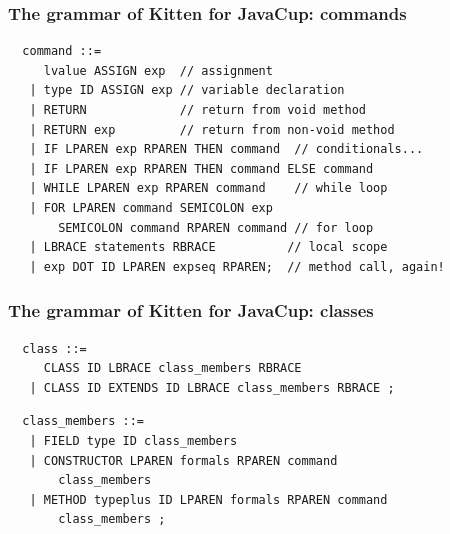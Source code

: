 \documentclass[11pt]{beamer}  %
\begin{document}
\begin{frame}[fragile]\frametitle{The grammar of Kitten for JavaCup: commands}

\begin{verbatim}
  command ::=
     lvalue ASSIGN exp  // assignment
   | type ID ASSIGN exp // variable declaration
   | RETURN             // return from void method
   | RETURN exp         // return from non-void method
   | IF LPAREN exp RPAREN THEN command  // conditionals...
   | IF LPAREN exp RPAREN THEN command ELSE command
   | WHILE LPAREN exp RPAREN command    // while loop
   | FOR LPAREN command SEMICOLON exp
       SEMICOLON command RPAREN command // for loop
   | LBRACE statements RBRACE          // local scope
   | exp DOT ID LPAREN expseq RPAREN;  // method call, again!
\end{verbatim}

\end{frame}

\begin{frame}[fragile]\frametitle{The grammar of Kitten for JavaCup: classes}

\begin{verbatim}
  class ::=
     CLASS ID LBRACE class_members RBRACE
   | CLASS ID EXTENDS ID LBRACE class_members RBRACE ;
\end{verbatim}

\begin{verbatim}
  class_members ::=
   | FIELD type ID class_members
   | CONSTRUCTOR LPAREN formals RPAREN command
       class_members
   | METHOD typeplus ID LPAREN formals RPAREN command
       class_members ;
\end{verbatim}

\end{frame}
\end{document}
